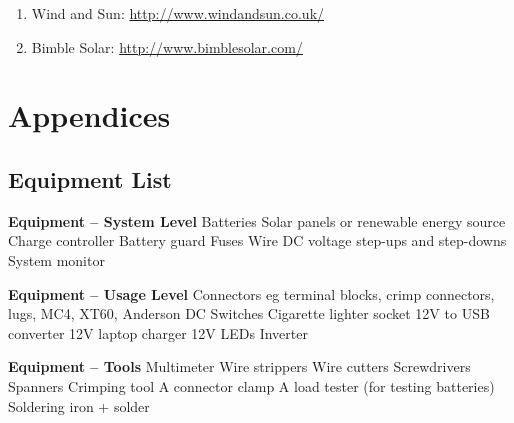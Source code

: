 \documentclass{article}
\theoremstyle{definition}
\theoremstyle{definition}
\theoremstyle{remark}
\begin{document}
    \begin{enumerate}[resume]
      \item Wind and Sun: \href{http://www.windandsun.co.uk/}{http://www.windandsun.co.uk/}
      \item Bimble Solar: \href{http://www.bimblesolar.com/}{http://www.bimblesolar.com/}
    \end{enumerate}
  


{\color{blue}\section{Appendices}} %
\label{sec:appendices}

  {\color{blue}\subsection{Equipment List}} %
  \label{sub:equipment_list}

    \textbf{Equipment – System Level} \newline
    Batteries \newline
    Solar panels or renewable energy source \newline
    Charge controller \newline
    Battery guard \newline
    Fuses \newline
    Wire \newline
    DC voltage step-ups and step-downs \newline
    System monitor

    \textbf{Equipment – Usage Level} \newline
    Connectors eg terminal blocks, crimp \newline
    connectors, lugs, MC4, XT60, Anderson \newline
    DC Switches \newline
    Cigarette lighter socket \newline
    12V to USB converter \newline
    12V laptop charger \newline
    12V LEDs \newline
    Inverter

    \textbf{Equipment – Tools} \newline
    Multimeter \newline
    Wire strippers \newline
    Wire cutters \newline
    Screwdrivers \newline
    Spanners \newline
    Crimping tool \newline
    A connector clamp \newline
    A load tester (for testing batteries) \newline
    Soldering iron + solder
      
\end{document}
